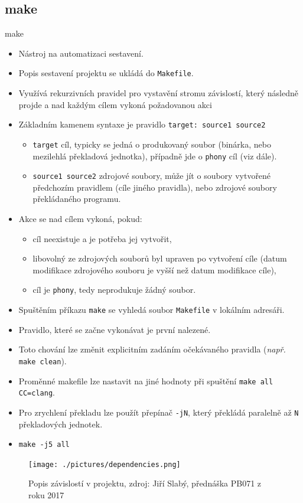 \documentclass[handout]{beamer}
\begin{document}
\subsection{make}
\begin{frame}[allowframebreaks]{make}
    \begin{itemize}
        \item Nástroj na automatizaci sestavení.
        \item Popis sestavení projektu se ukládá do \texttt{Makefile}.
        \item Využívá rekurzivních pravidel pro vystavění stromu závislostí, který následně projde a nad každým cílem
            vykoná požadovanou akci
        \item Základním kamenem syntaxe je pravidlo \texttt{target: source1 source2}
            \begin{itemize}
                \item \texttt{target} cíl, typicky se jedná o produkovaný soubor (binárka, nebo mezilehlá překladová jednotka), případně jde o \texttt{phony} cíl (viz dále).
                \item \texttt{source1 source2} zdrojové soubory, může jít o soubory vytvořené předchozím pravidlem (cíle jiného pravidla), nebo zdrojové soubory překládaného programu.
            \end{itemize}
        \item Akce se nad cílem vykoná, pokud: 
            \begin{itemize}
                \item cíl neexistuje a je potřeba jej vytvořit,
                \item libovolný ze zdrojových souborů byl upraven po vytvoření cíle (datum modifikace zdrojového souboru je vyšší než datum modifikace cíle),
                \item cíl je \texttt{phony}, tedy neprodukuje žádný soubor.
            \end{itemize}
        \item Spuštěním příkazu \texttt{make} se vyhledá soubor \texttt{Makefile} v lokálním adresáři.
        \item Pravidlo, které se začne vykonávat je první nalezené.
        \item Toto chování lze změnit explicitním zadáním očekávaného pravidla (\emph{např.} \texttt{make clean}).
        \item Proměnné makefile lze nastavit na jiné hodnoty při spuštění \texttt{make all CC=clang}.
        \item Pro zrychlení překladu lze použít přepínač \texttt{-jN}, který překládá paralelně až \texttt{N} překladových jednotek.
        \item \texttt{make -j5 all}
    \end{itemize}
    \begin{figure}
    \texttt{[image: ./pictures/dependencies.png]}
    \caption{\footnotesize Popis závislostí v projektu, zdroj: Jiří Slabý, přednáška PB071 z roku 2017}
\end{figure}
\end{frame}
\end{document}
